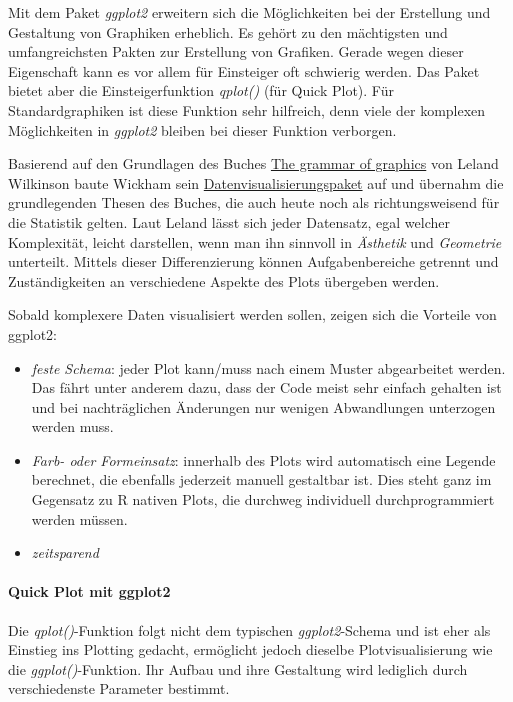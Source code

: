 \documentclass[]{article}
\providecommand{\tightlist}{%
  \setlength{\itemsep}{0pt}\setlength{\parskip}{0pt}}
\let\oldparagraph\paragraph
\renewcommand{\paragraph}[1]{\oldparagraph{#1}\mbox{}}
\begin{document}
Mit dem Paket \emph{ggplot2} erweitern sich die Möglichkeiten bei der
Erstellung und Gestaltung von Graphiken erheblich. Es gehört zu den
mächtigsten und umfangreichsten Pakten zur Erstellung von Grafiken.
Gerade wegen dieser Eigenschaft kann es vor allem für Einsteiger oft
schwierig werden. Das Paket bietet aber die Einsteigerfunktion
\emph{qplot()} (für Quick Plot). Für Standardgraphiken ist diese
Funktion sehr hilfreich, denn viele der komplexen Möglichkeiten in
\emph{ggplot2} bleiben bei dieser Funktion verborgen.

Basierend auf den Grundlagen des Buches
\href{http://ggplot2.org/resources/2007-past-present-future.pdf}{The
grammar of graphics} von Leland Wilkinson baute Wickham sein
\href{http://en.wikipedia.org/wiki/Ggplot2}{Datenvisualisierungspaket}
auf und übernahm die grundlegenden Thesen des Buches, die auch heute
noch als richtungsweisend für die Statistik gelten. Laut Leland lässt
sich jeder Datensatz, egal welcher Komplexität, leicht darstellen, wenn
man ihn sinnvoll in \emph{Ästhetik} und \emph{Geometrie} unterteilt.
Mittels dieser Differenzierung können Aufgabenbereiche getrennt und
Zuständigkeiten an verschiedene Aspekte des Plots übergeben werden.

Sobald komplexere Daten visualisiert werden sollen, zeigen sich die
Vorteile von ggplot2:

\begin{itemize}
\tightlist
\item
  \emph{feste Schema}: jeder Plot kann/muss nach einem Muster
  abgearbeitet werden. Das fährt unter anderem dazu, dass der Code meist
  sehr einfach gehalten ist und bei nachträglichen Änderungen nur
  wenigen Abwandlungen unterzogen werden muss.
\item
  \emph{Farb- oder Formeinsatz}: innerhalb des Plots wird automatisch
  eine Legende berechnet, die ebenfalls jederzeit manuell gestaltbar
  ist. Dies steht ganz im Gegensatz zu R nativen Plots, die durchweg
  individuell durchprogrammiert werden müssen.
\item
  \emph{zeitsparend}
\end{itemize}

\paragraph{Quick Plot mit ggplot2}\label{quick-plot-mit-ggplot2}

Die \emph{qplot()}-Funktion folgt nicht dem typischen
\emph{ggplot2}-Schema und ist eher als Einstieg ins Plotting gedacht,
ermöglicht jedoch dieselbe Plotvisualisierung wie die
\emph{ggplot()}-Funktion. Ihr Aufbau und ihre Gestaltung wird lediglich
durch verschiedenste Parameter bestimmt.
\end{document}

